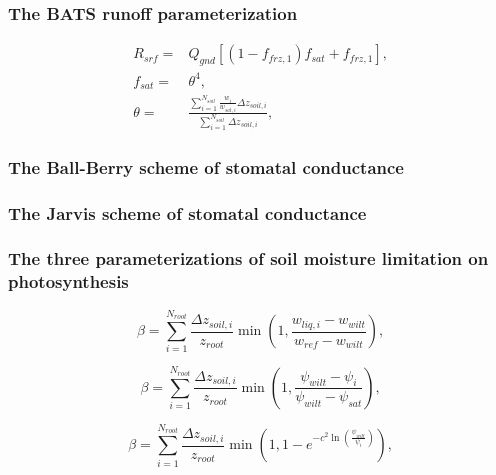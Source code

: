 \documentclass[essd]{copernicus}
\begin{document}
\subsubsection{The BATS runoff parameterization}
\begin{align}
    R_{srf} = & Q_{gnd} \left[ (1 - f_{frz,1}) f_{sat} + f_{frz,1} \right] \text{,}                                                 \\
    f_{sat} = & \theta^4 \text{,}                                                                                                   \\
    \theta =  & \frac{\sum_{i=1}^{N_{soil}}\frac{w_i}{w_{sat,i}}\Delta z_{soil,i}}{\sum_{i=1}^{N_{soil}}\Delta z_{soil,i}} \text{,}
\end{align}




\subsubsection{The Ball-Berry scheme of stomatal conductance}


\subsubsection{The Jarvis scheme of stomatal conductance}


\subsubsection{The three parameterizations of soil moisture limitation on photosynthesis}

\begin{equation}
    \beta = \sum_{i=1}^{N_{root}} \frac{\Delta z_{soil,i}}{z_{root}}
    \min\left(1, \frac{w_{liq,i} - w_{wilt}}{w_{ref} - w_{wilt}}\right)
    \text{,}
\end{equation}

\begin{equation}
    \beta = \sum_{i=1}^{N_{root}} \frac{\Delta z_{soil,i}}{z_{root}}
    \min\left(1, \frac{\psi_{wilt} - \psi_{i}}{\psi_{wilt} - \psi_{sat}}\right)
    \text{,}
\end{equation}

\begin{equation}
    \beta = \sum_{i=1}^{N_{root}} \frac{\Delta z_{soil,i}}{z_{root}}
    \min\left(1, 1 - e^{-c^2 \ln\left(\frac{\psi_{wilt}}{\psi_{i}} \right)} \right)
    \text{,}
\end{equation}
\end{document}
